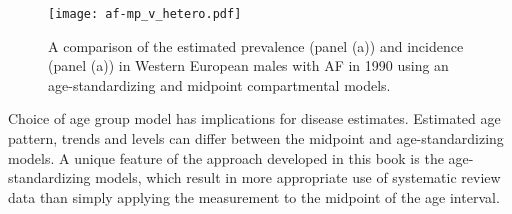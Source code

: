     \begin{figure}[h]
        \begin{center}
            \texttt{[image: af-mp\_v\_hetero.pdf]}
            \caption{A comparison of the estimated prevalence (panel (a)) and incidence
              (panel (a)) in Western European males with AF in 1990
              using an age-standardizing and midpoint compartmental models.}
            \label{fig:app-af compare}
        \end{center}
    \end{figure}

Choice of age group model has implications for disease estimates.
Estimated age pattern, trends and levels can differ between the
midpoint and age-standardizing models.  A unique feature of the
approach developed in this book is the age-standardizing models, which
result in more appropriate use of systematic review data than simply
applying the measurement to the midpoint of the age interval.
